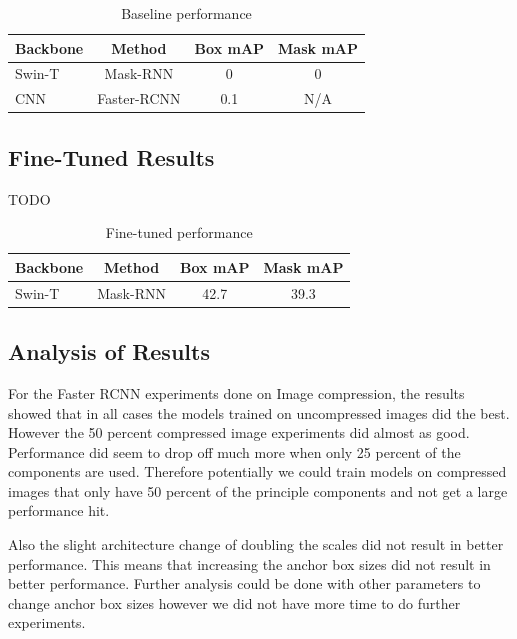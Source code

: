 \documentclass[10pt,twocolumn,letterpaper]{article}
\begin{document}
\begin{table}[hbt!]
\begin{center}
\begin{tabular}{|l|c|c|c|}
\hline
Backbone & Method   & Box mAP & Mask mAP \\
\hline\hline
Swin-T   & Mask-RNN & 0    & 0 \\
CNN   & Faster-RCNN & 0.1 & N/A \\
\hline
\end{tabular}
\end{center}
\caption{Baseline performance}
\end{table}

\subsection{Fine-Tuned Results}

TODO

\begin{table}[hbt!]
\begin{center}
\begin{tabular}{|l|c|c|c|}
\hline
Backbone & Method   & Box mAP & Mask mAP \\
\hline\hline
Swin-T   & Mask-RNN & 42.7    & 39.3 \\
\hline
\end{tabular}
\end{center}
\caption{Fine-tuned performance}
\end{table}

\subsection{Analysis of Results}

For the Faster RCNN experiments done on Image compression, the results showed that in all cases the models trained on uncompressed images did the best. However the 50 percent compressed image experiments did almost as good. Performance did seem to drop off much more when only 25 percent of the components are used. Therefore potentially we could train models on compressed images that only have 50 percent of the principle components and not get a large performance hit. 

Also the slight architecture change of doubling the scales did not result in better performance. This means that increasing the anchor box sizes did not result in better performance. Further analysis could be done with other parameters to change anchor box sizes however we did not have more time to do further experiments. 
\end{document}

